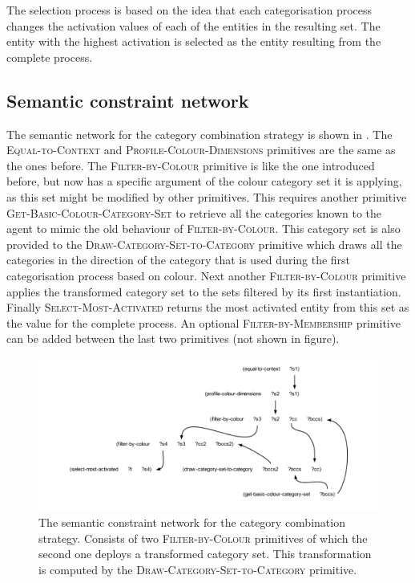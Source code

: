 The selection process is based on the idea that each categorisation
process changes the activation values of each of the entities in the
resulting set. The entity with the highest activation is selected as
the entity resulting from the complete process.

\subsection{Semantic constraint network}

The semantic network for the category combination strategy is
shown in . The
\textsc{Equal-to-Context} and \textsc{Profile-Colour-Dimensions}
primitives are the same as the ones before. The
\textsc{Filter-by-Colour} primitive is like the one introduced before,
but now has a specific argument of the colour category set it is
applying, as this set might be modified by other primitives. This
requires another primitive \textsc{Get-Basic-Colour-Category-Set} to
retrieve all the categories known to the agent to mimic the old
behaviour of \textsc{Filter-by-Colour}. This category set is also
provided to the \textsc{Draw-Category-Set-to-Category} primitive which
draws all the categories in the direction of the category that is used
during the first categorisation process based on colour. Next another
\textsc{Filter-by-Colour} primitive applies the transformed category
set to the sets filtered by its first instantiation. Finally
\textsc{Select-Most-Activated} returns the most activated entity from
this set as the value for the complete process.  An optional
\textsc{Filter-by-Membership} primitive can be added between the last
two primitives (not shown in figure).

\begin{figure}[htbp]
  \centering
  \includegraphics[width=\textwidth]{./category-combination/figures/semantic-program.pdf}
  \caption[The semantic constraint network for the category combination
  strategy]{The semantic constraint network for the category combination
      strategy. Consists of two \textsc{Filter-by-Colour} primitives
    of which the second one deploys a transformed category set. This
    transformation is computed by the
    \textsc{Draw-Category-Set-to-Category} primitive.}
  \label{f:ccs-semantic-program}
\end{figure}

